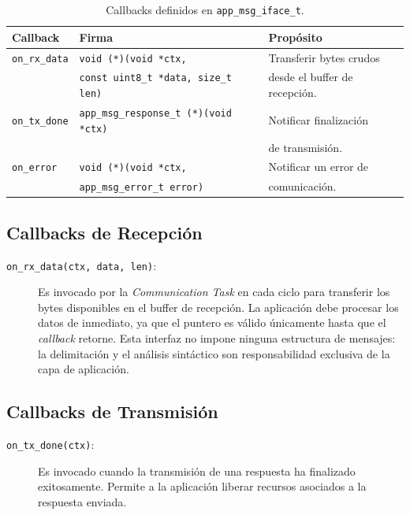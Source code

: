 \begin{table}[htbp]
    \centering
    \caption{Callbacks definidos en \texttt{app\_msg\_iface\_t}.}
    \label{tab:app-msg-iface}
    \begin{tabular}{llp{6cm}}
        \toprule
        \textbf{Callback} & \textbf{Firma} & \textbf{Propósito} \\
        \midrule
        \texttt{on\_rx\_data} & \texttt{void (*)(void *ctx,} & Transferir bytes crudos \\
                              & \texttt{const uint8\_t *data, size\_t len)} & desde el buffer de recepción. \\
        \texttt{on\_tx\_done} & \texttt{app\_msg\_response\_t (*)(void *ctx)} & Notificar finalización \\
                              &                                    & de transmisión. \\
        \texttt{on\_error}    & \texttt{void (*)(void *ctx,} & Notificar un error de \\
                              & \texttt{app\_msg\_error\_t error)} & comunicación. \\
        \bottomrule
    \end{tabular}
\end{table}

\subsection{Callbacks de Recepción}
\label{subsec:app-recepcion}

\begin{description}
    \item[\texttt{on\_rx\_data(ctx, data, len)}:] Es invocado por la \textit{Communication Task} en cada ciclo para transferir los bytes disponibles en el buffer de recepción. La aplicación debe procesar los datos de inmediato, ya que el puntero es válido únicamente hasta que el \textit{callback} retorne. Esta interfaz no impone ninguna estructura de mensajes: la delimitación y el análisis sintáctico son responsabilidad exclusiva de la capa de aplicación.
\end{description}

\subsection{Callbacks de Transmisión}
\label{subsec:app-transmision}

\begin{description}
    \item[\texttt{on\_tx\_done(ctx)}:] Es invocado cuando la transmisión de una respuesta ha finalizado exitosamente. Permite a la aplicación liberar recursos asociados a la respuesta enviada.
\end{description}

